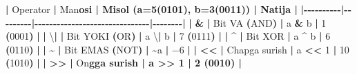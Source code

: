 \documentclass[a4paper,11pt,twoside,openright]{book}
\newenvironment{Shaded}{\begin{snugshade}}{\end{snugshade}}
\newcommand{\BaseNTok}[1]{\textcolor[rgb]{0.00,0.00,0.81}{#1}}
\newcommand{\CharTok}[1]{\textcolor[rgb]{0.31,0.60,0.02}{#1}}
\newcommand{\DecValTok}[1]{\textcolor[rgb]{0.00,0.00,0.81}{#1}}
\newcommand{\ErrorTok}[1]{\textcolor[rgb]{0.64,0.00,0.00}{\textbf{#1}}}
\newcommand{\NormalTok}[1]{#1}
\newcommand{\OperatorTok}[1]{\textcolor[rgb]{0.81,0.36,0.00}{\textbf{#1}}}
\begin{document}
\begin{Shaded}
\begin{Highlighting}[]
\OperatorTok{|}\NormalTok{ Operator }\OperatorTok{|}\NormalTok{ Ma}\CharTok{\textquotesingle{}n}\ErrorTok{osi | Misol (\textasciigrave{}a=5(0101), b=3(0011)\textasciigrave{}) | Natija |}
\OperatorTok{|{-}{-}{-}{-}{-}{-}{-}{-}{-}{-}|{-}{-}{-}{-}{-}{-}{-}{-}{-}|{-}{-}{-}{-}{-}{-}{-}{-}{-}{-}{-}{-}{-}{-}{-}{-}{-}{-}{-}{-}{-}{-}{-}{-}{-}{-}{-}{-}{-}{-}{-}|{-}{-}{-}{-}{-}{-}{-}{-}|}
\OperatorTok{|} \ErrorTok{\textasciigrave{}}\OperatorTok{\&}\ErrorTok{\textasciigrave{}} \OperatorTok{|}\NormalTok{ Bit VA }\OperatorTok{(}\NormalTok{AND}\OperatorTok{)} \OperatorTok{|} \ErrorTok{\textasciigrave{}}\NormalTok{a }\OperatorTok{\&}\NormalTok{ b}\ErrorTok{\textasciigrave{}} \OperatorTok{|} \DecValTok{1} \OperatorTok{(}\BaseNTok{0001}\OperatorTok{)} \OperatorTok{|}
\OperatorTok{|} \ErrorTok{\textasciigrave{}}\NormalTok{\textbackslash{}}\OperatorTok{|}\ErrorTok{\textasciigrave{}} \OperatorTok{|}\NormalTok{ Bit YOKI }\OperatorTok{(}\NormalTok{OR}\OperatorTok{)} \OperatorTok{|} \ErrorTok{\textasciigrave{}}\NormalTok{a \textbackslash{}}\OperatorTok{|}\NormalTok{ b}\ErrorTok{\textasciigrave{}} \OperatorTok{|} \DecValTok{7} \OperatorTok{(}\BaseNTok{0111}\OperatorTok{)} \OperatorTok{|}
\OperatorTok{|} \ErrorTok{\textasciigrave{}}\OperatorTok{\^{}}\ErrorTok{\textasciigrave{}} \OperatorTok{|}\NormalTok{ Bit XOR }\OperatorTok{|} \ErrorTok{\textasciigrave{}}\NormalTok{a }\OperatorTok{\^{}}\NormalTok{ b}\ErrorTok{\textasciigrave{}} \OperatorTok{|} \DecValTok{6} \OperatorTok{(}\BaseNTok{0110}\OperatorTok{)} \OperatorTok{|}
\OperatorTok{|} \ErrorTok{\textasciigrave{}}\OperatorTok{\textasciitilde{}}\ErrorTok{\textasciigrave{}} \OperatorTok{|}\NormalTok{ Bit EMAS }\OperatorTok{(}\NormalTok{NOT}\OperatorTok{)} \OperatorTok{|} \ErrorTok{\textasciigrave{}}\OperatorTok{\textasciitilde{}}\NormalTok{a}\ErrorTok{\textasciigrave{}} \OperatorTok{|}\NormalTok{ −}\DecValTok{6} \OperatorTok{|}
\OperatorTok{|} \ErrorTok{\textasciigrave{}}\OperatorTok{\textless{}\textless{}}\ErrorTok{\textasciigrave{}} \OperatorTok{|}\NormalTok{ Chapga surish }\OperatorTok{|} \ErrorTok{\textasciigrave{}}\NormalTok{a }\OperatorTok{\textless{}\textless{}} \DecValTok{1}\ErrorTok{\textasciigrave{}} \OperatorTok{|} \DecValTok{10} \OperatorTok{(}\DecValTok{1010}\OperatorTok{)} \OperatorTok{|}
\OperatorTok{|} \ErrorTok{\textasciigrave{}}\OperatorTok{\textgreater{}\textgreater{}}\ErrorTok{\textasciigrave{}} \OperatorTok{|}\NormalTok{ O}\CharTok{\textquotesingle{}n}\ErrorTok{gga surish | \textasciigrave{}a \textgreater{}\textgreater{} 1\textasciigrave{} | 2 (0010) |}


\end{Highlighting}
\end{Shaded}
\end{document}

